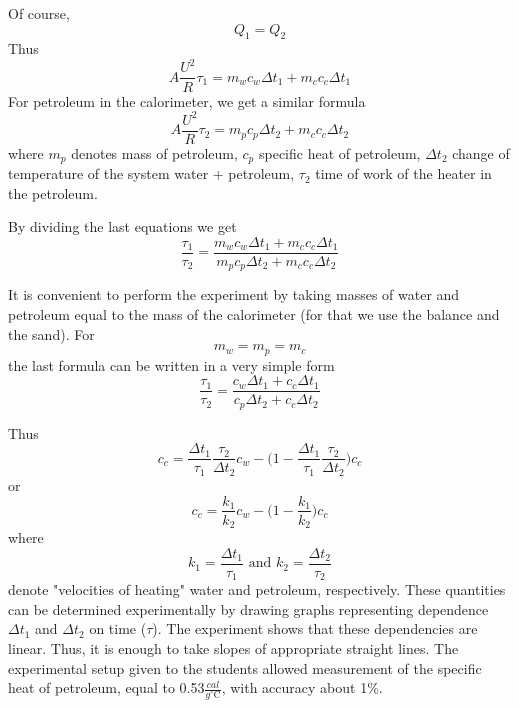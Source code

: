 \documentclass[12pt,a4paper]{book}
\begin{document}
	Of course,
	\begin{equation*}
		Q_1=Q_2
	\end{equation*}
	Thus
	\begin{equation*}
		A\frac{U^2}{R}\tau_1=m_wc_w\Delta t_1+m_cc_c\Delta t_1
	\end{equation*}
	For petroleum in the calorimeter, we get a similar formula
	\begin{equation*}
		A\frac{U^2}{R}\tau_2=m_pc_p\Delta t_2+m_cc_c\Delta t_2
	\end{equation*}
	where $m_p$ denotes mass of petroleum, $c_p$ specif\mbox{}ic heat of petroleum, $\Delta t_2$ change of temperature of the system water + petroleum, $\tau_2$ time of work of the heater in the petroleum.\par
	By dividing the last equations we get
	\begin{equation*}
		\frac{\tau_1}{\tau_2}=\frac{m_wc_w\Delta t_1+m_cc_c\Delta t_1}{m_pc_p\Delta t_2+m_cc_c\Delta t_2}
	\end{equation*}\par
	It is convenient to perform the experiment by taking masses of water and petroleum equal to the mass of the calorimeter (for that we use the balance and the sand). For
	\begin{equation*}
		m_w=m_p=m_c
	\end{equation*}
	the last formula can be written in a very simple form
	\begin{equation*}
		\frac{\tau_1}{\tau_2}=\frac{c_w\Delta t_1+c_c\Delta t_1}{c_p\Delta t_2+c_c\Delta t_2}
	\end{equation*}\par
	Thus
	\begin{equation*}
		c_c=\frac{\Delta t_1}{\tau_1}\frac{\tau_2}{\Delta t_2}c_w-\Big(1-\frac{\Delta t_1}{\tau_1}\frac{\tau_2}{\Delta t_2}\Big)c_c
	\end{equation*}
	or
	\begin{equation}
		c_c=\frac{k_1}{k_2}c_w-\Big(1-\frac{k_1}{k_2}\Big)c_c
	\end{equation}
	where
	\begin{equation*}
		k_1=\frac{\Delta t_1}{\tau_1}\text{ and }k_2=\frac{\Delta t_2}{\tau_2}
	\end{equation*}
	denote "velocities of heating" water and petroleum, respectively. These quantities can be determined experimentally by drawing graphs representing dependence $\Delta t_1$ and $\Delta t_2$ on time ($\tau$). The experiment shows that these dependencies are linear. Thus, it is enough to take slopes of appropriate straight lines. The experimental setup given to the students allowed measurement of the specif\mbox{}ic heat of petroleum, equal to 0.53$\frac{cal}{g^{\circ}\mathrm{C}}$, with accuracy about 1\%.\par
\end{document}
